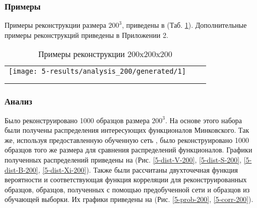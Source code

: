 		\subsubsection{Примеры}
			Примеры реконструкции размера $200^3$, приведены в (Таб. \ref{5-gen-200}). Дополнительные примеры реконструкций приведены в Приложении 2.
		
			\begin{table}[h!]
				\begin{center}
					\begin{tabular}{p{5cm} p{5cm} p{5cm}}
						\toprule
						\texttt{[image: 5-results/analysis\_200/generated/1]}
						&
						&
						\\
						&
						&
						\\
						&
						&
						\\
						\bottomrule
					\end{tabular}
					\caption{Примеры реконструкции 200x200x200}
					\label{5-gen-200}
				\end{center}
			\end{table} 
		
		\subsubsection{Анализ}
			Было реконструировано 1000 образцов размера $200^3$. На основе этого набора были получены распределения интересующих функционалов Минковского. Так же, используя предоставленную обученную сеть \cite{Mosser}, было реконструировано 1000 образцов того же размера для сравнения распределений функционалов. Графики полученных распределений приведены на (Рис. \ref{5-dist-V-200}, \ref{5-dist-S-200}, \ref{5-dist-B-200}, \ref{5-dist-Xi-200}). Также были рассчитаны двухточечная функция вероятности и соответствующая функция корреляции для реконструированных образцов, образцов, полученных с помощью предобученной сети \cite{Mosser} и образцов из обучающей выборки. Их графики приведены на (Рис. \ref{5-prob-200}, \ref{5-corr-200}).
		
